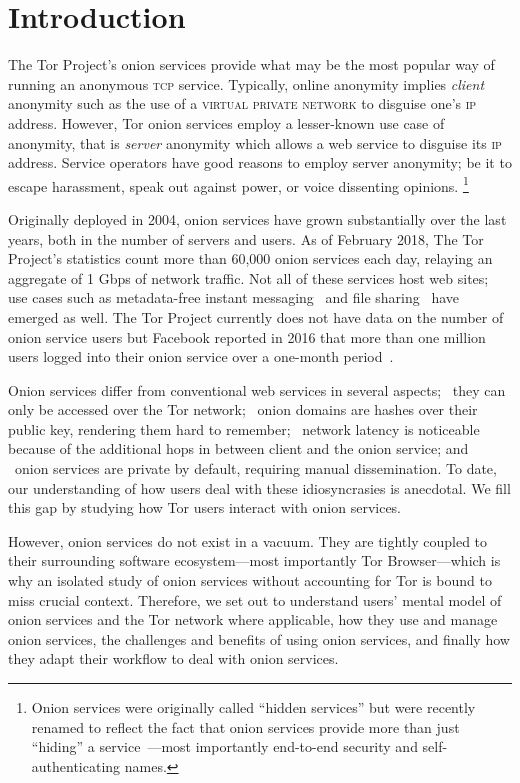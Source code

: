 \section{Introduction}
\label{sec:introduction}
The Tor Project's onion services provide what may be the
most popular way of running an anonymous \textsc{tcp} service. Typically, online anonymity implies \emph{client} anonymity
such as the use of a \textsc{virtual private network} to disguise one's \textsc{ip} address.  However, Tor onion services employ a lesser-known use case of anonymity, that is \emph{server} anonymity which allows a web service to
disguise its \textsc{ip} address.  Service operators have good reasons to employ
server anonymity; be it to escape harassment, speak out against power, or voice
dissenting opinions.  \footnote{Onion
services were originally called ``hidden services'' but were recently renamed to
reflect the fact that onion services provide more than just ``hiding'' a
service~\cite{Johnson2015a}---most importantly end-to-end security and
self-authenticating names.}

Originally deployed in 2004, onion services have grown substantially over the
last years, both in the number of servers and users.  As of February 2018, The
Tor Project's statistics count more than 60,000 onion services each day,
relaying an aggregate of 1 Gbps of network traffic.  Not all of these services
host web sites; use cases such as metadata-free instant
messaging~\cite{ricochet} and file sharing~\cite{onionshare} have emerged as
well.  The Tor Project currently does not have data on the number of onion
service users but Facebook reported in 2016 that more than one million users
logged into their onion service over a one-month period~\cite{facebook-users}.

Onion services differ from conventional web services in several aspects;
\first~they can only be accessed over the Tor network; \second~onion domains are
hashes over their public key, rendering them hard to remember; \third~network
latency is noticeable because of the additional hops in between client and the
onion service; and \fourth~onion services are private by default, requiring
manual dissemination.  To date, our understanding of how users deal with these
idiosyncrasies is anecdotal.  We fill this gap by studying how Tor users
interact with onion services.

However, onion services do not exist in a vacuum.
They are tightly coupled to their
surrounding software ecosystem---most importantly Tor Browser---which is why an
isolated study of onion services without accounting for Tor is bound to miss crucial context.  Therefore, we set out to understand users'
mental model of onion services and the Tor network where applicable, how they use and manage onion services, the challenges and benefits of using onion services, and finally how they adapt their workflow to deal with onion services.

